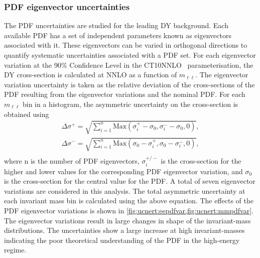 \subsubsection{PDF eigenvector uncertainties}
The PDF uncertainties are studied for the leading DY background. Each available PDF has a set of independent parameters known as eigenvectors associated with it. These eigenvectors can be varied in orthogonal directions to quantify systematic uncertainties associated with a PDF set. For each eigenvector variation at the 90\% Confidence Level in the CT10NNLO~\cite{ct10} parameterisation, the DY cross-section is calculated at NNLO as a function of $m_{\ell\ell}$. The eigenvector variation uncertainty is taken as the relative deviation of the cross-sections of the PDF resulting from the eigenvector variations and the nominal PDF. For each $m_{\ell\ell}$ bin in a histogram, the asymmetric uncertainty on the cross-section is obtained using
\begin{equation}
    \begin{aligned}
    \Delta \sigma^+ = \sqrt{\sum^n_{i=1}\mathrm{Max}\left(\sigma_i^+ - \sigma_0, \sigma^-_i - \sigma_0,0     \right)}, \\
    \Delta \sigma^- = \sqrt{\sum^n_{i=1}\mathrm{Max}\left(\sigma_0 - \sigma_i^+, \sigma_0 -\sigma^-_i,0  \right)}, \\
    \end{aligned}
\end{equation}
where n is the number of PDF eigenvectors, $\sigma_i^{+/-}$ is the cross-section for the higher and lower values for the corresponding PDF eigenvector variation, and $\sigma_0$ is the cross-section for the central value for the PDF. A total of seven eigenvector variations are considered in this analysis. The total asymmetric uncertainty at each invariant mass bin is calculated using the above equation. The effects of the PDF eigenvector variations is shown in \cref{fig:ucnert:eepdfvar,fig:ucnert:mmpdfvar}. The eigenvector variations result in large changes in shape of the invariant-mass distributions. The uncertainties show a large increase at high invariant-masses indicating the poor theoretical understanding of the PDF in the high-energy regime.

